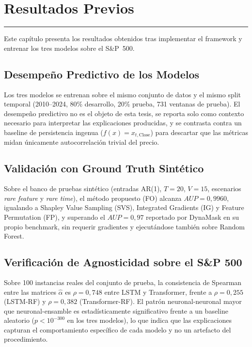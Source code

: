 \chapter{Resultados Previos}
\label{chap:resultados_previos}
\hrule \bigskip \vspace*{1cm}

Este capítulo presenta los resultados obtenidos tras implementar el framework y entrenar los tres modelos sobre el S\&P~500.

\section{Desempeño Predictivo de los Modelos}

Los tres modelos se entrenan sobre el mismo conjunto de datos y el mismo split temporal (2010--2024, 80\% desarrollo, 20\% prueba, 731 ventanas de prueba). El desempeño predictivo no es el objeto de esta tesis, se reporta solo como contexto necesario para interpretar las explicaciones producidas, y se contrasta contra un baseline de persistencia ingenua ($f(x) = x_{t,\text{Close}}$) para descartar que las métricas midan únicamente autocorrelación trivial del precio.

\section{Validación con Ground Truth Sintético}

Sobre el banco de pruebas sintético (entradas AR(1), $T{=}20$, $V{=}15$, escenarios \emph{rare feature} y \emph{rare time}), el método propuesto (FO) alcanza $AUP=0{,}9960$, igualando a Shapley Value Sampling (SVS), Integrated Gradients (IG) y Feature Permutation (FP), y superando el $AUP=0{,}97$ reportado por DynaMask en su propio benchmark, sin requerir gradientes y ejecutándose también sobre Random Forest.

\section{Verificación de Agnosticidad sobre el S\&P 500}

Sobre 100 instancias reales del conjunto de prueba, la consistencia de Spearman entre las matrices $\hat{\alpha}$ es $\rho=0{,}748$ entre LSTM y Transformer, frente a $\rho=0{,}255$ (LSTM-RF) y $\rho=0{,}382$ (Transformer-RF). El patrón neuronal-neuronal mayor que neuronal-ensamble es estadísticamente significativo frente a un baseline aleatorio ($p<10^{-300}$ en los tres modelos), lo que indica que las explicaciones capturan el comportamiento específico de cada modelo y no un artefacto del procedimiento.

